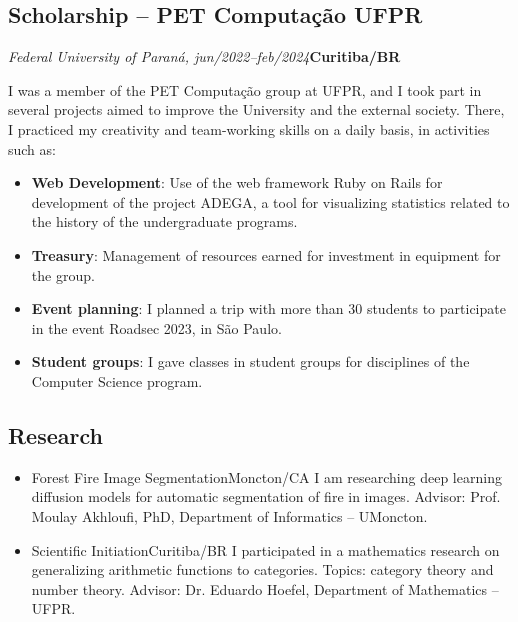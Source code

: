 \documentclass[a4paper, 12pt]{moderncv}
\begin{document}
\subsection{\small{Scholarship -- PET Computação UFPR}}
\textit{Federal University of Paraná, jun/2022--feb/2024}\hspace{175pt}\textbf{Curitiba/BR}

\vspace{3pt}
I was a member of the PET Computação group at UFPR, and I took part in several
projects aimed to improve the University and the external society. There, I
practiced my creativity and team-working skills on a daily basis, in activities
such as:
\vspace{4pt}
\begin{itemize}
    \item{\textbf{Web Development}: Use of the web framework Ruby on Rails for
          development of the project ADEGA, a tool for visualizing statistics
          related to the history of the undergraduate programs.}
    \item{\textbf{Treasury}: Management of resources earned for investment in
          equipment for the group.}
    \item{\textbf{Event planning}: I planned a trip with more than 30 students
          to participate in the event Roadsec 2023, in São Paulo.}
    \item{\textbf{Student groups}: I gave classes in student groups for
          disciplines of the Computer Science program.}
\end{itemize}

\vspace{4pt}
\subsection{\small{Research}}
\begin{itemize}
    \item{
        {Forest Fire Image Segmentation}{Moncton/CA}{}
        {I am researching deep learning diffusion models for automatic segmentation of
        fire in images. Advisor: Prof. Moulay Akhloufi, PhD, Department of
        Informatics -- UMoncton.}}
    \item{
        {Scientific Initiation}{Curitiba/BR}{}
        {I participated in a mathematics research on generalizing arithmetic functions
        to categories. Topics: category theory and number theory. Advisor: Dr. Eduardo
        Hoefel, Department of Mathematics -- UFPR.}}
\end{itemize}
\end{document}
